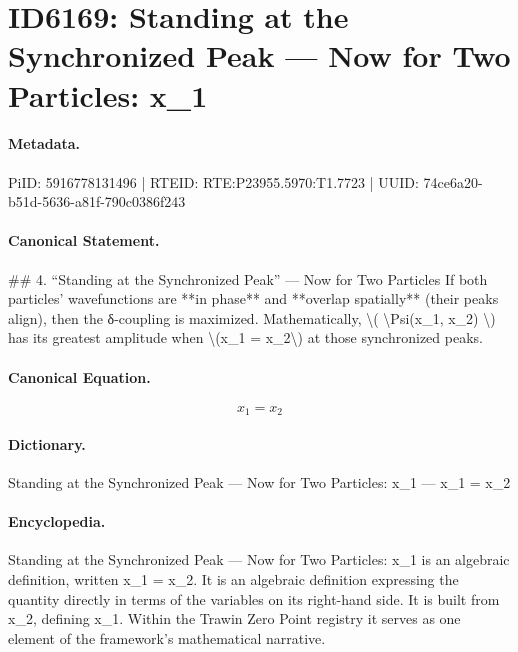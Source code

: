 \section*{ID6169: Standing at the Synchronized Peak — Now for Two Particles: x\_1}
\paragraph{Metadata.}
PiID: 5916778131496 | RTEID: RTE:P23955.5970:T1.7723 | UUID: 74ce6a20-b51d-5636-a81f-790c0386f243

\paragraph{Canonical Statement.}
\#\# 4. “Standing at the Synchronized Peak” — Now for Two Particles If both particles’ wavefunctions are **in phase** and **overlap spatially** (their peaks align), then the δ-coupling is maximized. Mathematically, \textbackslash{}( \textbackslash{}Psi(x\_1, x\_2) \textbackslash{}) has its greatest amplitude when \textbackslash{}(x\_1 = x\_2\textbackslash{}) at those synchronized peaks.

\paragraph{Canonical Equation.}
\[
x_1 = x_2
\]

\paragraph{Dictionary.}
Standing at the Synchronized Peak — Now for Two Particles: x\_1 — x\_1 = x\_2

\paragraph{Encyclopedia.}
Standing at the Synchronized Peak — Now for Two Particles: x\_1 is an algebraic definition, written x\_1 = x\_2. It is an algebraic definition expressing the quantity directly in terms of the variables on its right-hand side. It is built from x\_2, defining x\_1. Within the Trawin Zero Point registry it serves as one element of the framework's mathematical narrative.
